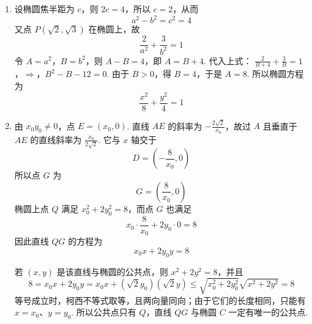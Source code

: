 \begin{solution}
\begin{enumerate}
\item 设椭圆焦半距为 \(c\)，则 \(2c=4\)，所以 \(c=2\)，从而
\[
a^2-b^2=c^2=4
\]
又点 \(P(\sqrt2,\sqrt3)\) 在椭圆上，故
\[
\frac2{a^2}+\frac3{b^2}=1
\]
令 \(A=a^2\)，\(B=b^2\)，则 \(A-B=4\)，即 \(A=B+4\). 代入上式：
\(\frac2{B+4}+\frac3B=1\)，\(\Longrightarrow\)，\(B^2-B-12=0\).
由于 \(B>0\)，得 \(B=4\)，于是 \(A=8\). 所以椭圆方程为
\[
\frac{x^2}{8}+\frac{y^2}{4}=1
\]

\item 由 \(x_0y_0\neq0\)，点 \(E=(x_0,0)\). 直线 \(AE\) 的斜率为 \(-\frac{2\sqrt2}{x_0}\)，故过 \(A\) 且垂直于 \(AE\) 的直线斜率为 \(\frac{x_0}{2\sqrt2}\). 它与 \(x\) 轴交于
\[
D=\left(-\frac8{x_0},0\right)
\]
所以点 \(G\) 为
\[
G=\left(\frac8{x_0},0\right)
\]
椭圆上点 \(Q\) 满足 \(x_0^2+2y_0^2=8\)，而点 \(G\) 也满足
\[
x_0\cdot\frac8{x_0}+2y_0\cdot0=8
\]
因此直线 \(QG\) 的方程为
\[
x_0x+2y_0y=8
\]

若 \((x,y)\) 是该直线与椭圆的公共点，则 \(x^2+2y^2=8\)，并且
\[
8=x_0x+2y_0y
=x_0x+(\sqrt2y_0)(\sqrt2y)
\leqslant\sqrt{x_0^2+2y_0^2}\sqrt{x^2+2y^2}=8
\]
等号成立时，柯西不等式取等，且两向量同向；由于它们的长度相同，只能有 \(x=x_0\)、\(y=y_0\). 所以公共点只有 \(Q\)，直线 \(QG\) 与椭圆 \(C\) 一定有唯一的公共点.
\end{enumerate}
\end{solution}
